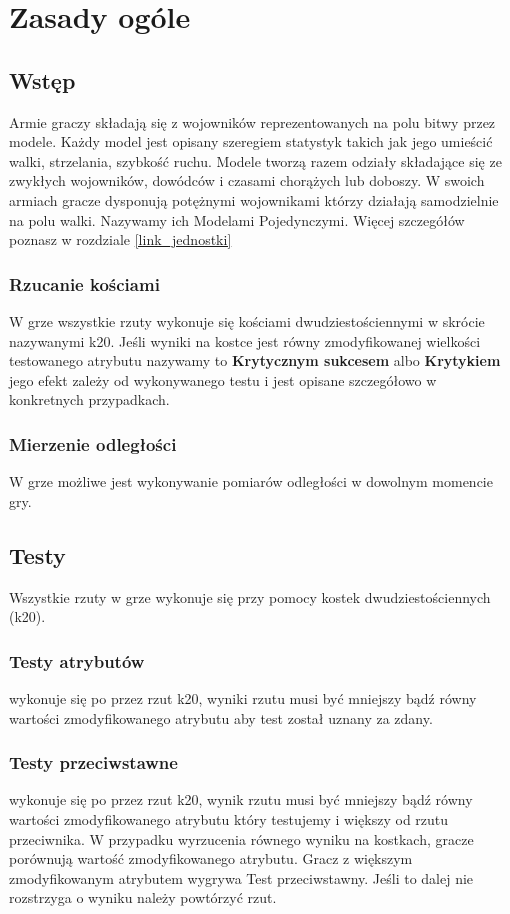 \chapter{Zasady ogóle}

\section{Wstęp}

Armie graczy składają się z wojowników reprezentowanych na polu bitwy przez modele. Każdy model jest opisany szeregiem statystyk takich jak jego umieścić walki, strzelania, szybkość ruchu. Modele tworzą razem odziały składające się ze zwykłych wojowników, dowódców i czasami chorążych lub doboszy. W swoich armiach gracze dysponują potężnymi wojownikami którzy działają samodzielnie na polu walki. Nazywamy ich Modelami Pojedynczymi.  Więcej szczegółów poznasz w rozdziale \ref{link_jednostki}

\subsection{Rzucanie kościami}
W grze wszystkie rzuty wykonuje się kościami dwudziestościennymi w skrócie nazywanymi k20. Jeśli wyniki na kostce jest równy zmodyfikowanej wielkości testowanego atrybutu nazywamy to \textbf{Krytycznym sukcesem} albo \textbf{Krytykiem} jego efekt zależy od wykonywanego testu i jest opisane szczegółowo w konkretnych przypadkach. 

\subsection{Mierzenie odległości}
W grze możliwe jest wykonywanie pomiarów odległości w dowolnym momencie gry. 

\section{Testy}

Wszystkie rzuty w grze wykonuje się przy pomocy kostek dwudziestościennych (k20).

\subsection{Testy atrybutów} wykonuje się po przez rzut k20, wyniki rzutu musi być mniejszy bądź równy wartości zmodyfikowanego atrybutu aby test został uznany za zdany. 

\subsection{Testy przeciwstawne} wykonuje się po przez rzut k20, wynik rzutu musi być mniejszy bądź równy wartości zmodyfikowanego atrybutu który testujemy i większy od rzutu przeciwnika. W przypadku wyrzucenia równego wyniku na kostkach, gracze porównują wartość zmodyfikowanego atrybutu. Gracz z większym zmodyfikowanym atrybutem wygrywa Test przeciwstawny. Jeśli to dalej nie rozstrzyga o wyniku należy powtórzyć rzut. 

